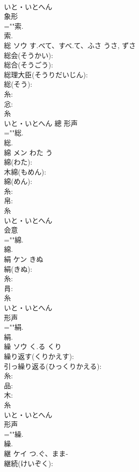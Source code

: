 \documentclass[8pt]{extreport}
\begin{document}
\begin{CJK}{UTF8}{min}
\\	いと・いとへん	
\\	象形 
\\	=""索.
\\	索.
\\	総	ソウ	す.べて、すべ.て、ふさ	うさ, ずさ	
\\	総会(そうかい): 
\\	総合(そうごう): 
\\	総理大臣(そうりだいじん): 
\\	総(そう): 
\\	糸: 
\\	忩: 
\\	糸	
\\	いと・いとへん	總	形声 
\\	=""総.
\\	総.
\\	綿	メン	わた	う	
\\	綿(わた): 
\\	木綿(もめん): 
\\	綿(めん): 
\\	糸: 
\\	帛: 
\\	糸	
\\	いと・いとへん	
\\	会意 
\\	=""綿.
\\	綿.
\\	絹	ケン	きぬ		
\\	絹(きぬ): 
\\	糸: 
\\	肙: 
\\	糸	
\\	いと・いとへん	
\\	形声 
\\	=""絹.
\\	絹.
\\	繰	ソウ	く.る	くり	
\\	繰り返す(くりかえす): 
\\	引っ繰り返る(ひっくりかえる): 
\\	糸: 
\\	品: 
\\	木: 
\\	糸	
\\	いと・いとへん	
\\	形声 
\\	=""繰.
\\	繰.
\\	継	ケイ	つ.ぐ、まま-		
\\	継続(けいぞく): 

\end{CJK}
\end{document}
